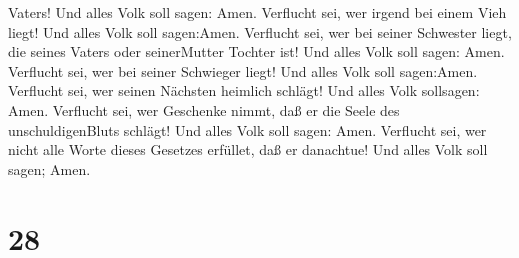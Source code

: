 Vaters! Und alles Volk soll sagen: Amen.  Verflucht sei,
wer irgend bei einem Vieh liegt! Und alles Volk soll sagen:Amen.
 Verflucht sei, wer bei seiner Schwester liegt, die seines
Vaters oder seinerMutter Tochter ist! Und alles Volk soll sagen: Amen.
 Verflucht sei, wer bei seiner Schwieger liegt! Und alles
Volk soll sagen:Amen.  Verflucht sei, wer seinen Nächsten
heimlich schlägt! Und alles Volk sollsagen: Amen. 
Verflucht sei, wer Geschenke nimmt, daß er die Seele des
unschuldigenBluts schlägt! Und alles Volk soll sagen: Amen.
 Verflucht sei, wer nicht alle Worte dieses Gesetzes
erfüllet, daß er danachtue! Und alles Volk soll sagen; Amen.

\hypertarget{section-27}{%
\section{28}\label{section-27}}

